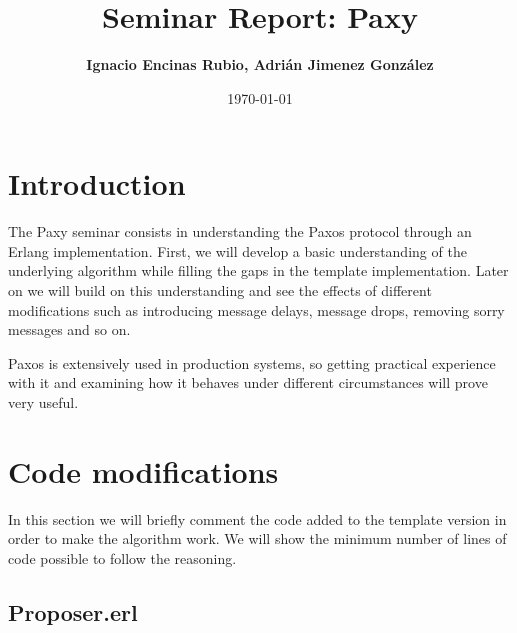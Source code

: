 \documentclass[a4paper, 10pt]{article}
\title{Seminar Report: Paxy}
\author{\textbf{Ignacio Encinas Rubio, Adrián Jimenez González}}
\date{\normalsize\today{}}
\begin{document}
\maketitle

  
  

\section{Introduction}

The Paxy seminar consists in understanding the Paxos protocol through an Erlang implementation. First, we will develop a basic understanding of the underlying algorithm while filling the gaps in the template implementation. Later on we will build on this understanding and see the effects of different modifications such as introducing message delays, message drops, removing sorry messages and so on. 

Paxos is extensively used in production systems, so getting practical experience with it and examining how it behaves under different circumstances will prove very useful.


\section{Code modifications}

   In this section we will briefly comment the code added to the template version in order to
   make the algorithm work. We will show the minimum number of lines of code possible to follow the reasoning.

  \subsection{Proposer.erl}
\end{document}
